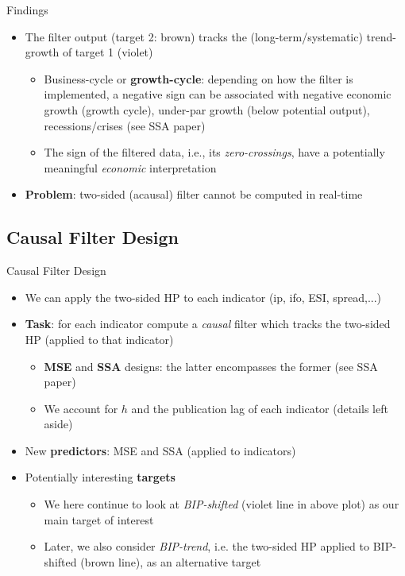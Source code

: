 \documentclass{beamer}
\begin{document}
\begin{frame} {Findings}
\begin{itemize}
\item The filter output (target 2: brown) tracks the (long-term/systematic) trend-growth of target 1 (violet)
\begin{itemize}
\item Business-cycle or \textbf{growth-cycle}: depending on how the filter is implemented, a negative sign can be associated with negative economic growth (growth cycle), under-par growth (below potential output), recessions/crises (see SSA paper)
\item The sign of the filtered data, i.e., its \emph{zero-crossings}, have a potentially meaningful \emph{economic} interpretation
\end{itemize}
\item \textbf{Problem}: two-sided (acausal) filter cannot be computed in real-time 
\end{itemize}
\end{frame}






\subsection{Causal Filter Design}

\begin{frame} {Causal Filter Design}
\begin{itemize}
\item We can apply the two-sided HP to each indicator (ip, ifo, ESI, spread,...)
\item \textbf{Task}: for each indicator compute a \emph{causal} filter which tracks the two-sided HP (applied to that indicator) 
\begin{itemize}
\item \textbf{MSE} and \textbf{SSA} designs: the latter encompasses the former (see SSA paper)
\item We account for $h$ and the publication lag of each indicator (details left aside)
\end{itemize}
\item New \textbf{predictors}: MSE and SSA (applied to indicators)
\item Potentially interesting \textbf{targets}
\begin{itemize}
\item We here continue to look at \emph{BIP-shifted} (violet line in above plot) as our main target of interest 
\item Later, we also consider \emph{BIP-trend}, i.e. the two-sided HP  applied to BIP-shifted (brown line), as an alternative target
\end{itemize}
\end{itemize}
\end{frame}
\end{document}
